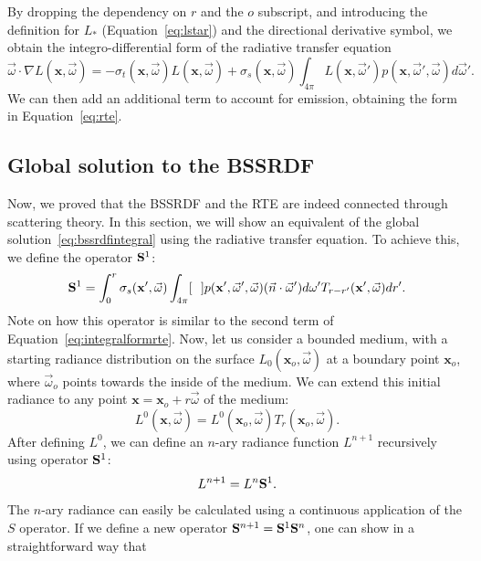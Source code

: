 By dropping the dependency on $r$ and the $o$ subscript, and introducing the definition for $L_*$ (Equation~\ref{eq:lstar}) and the directional derivative symbol, we obtain the integro-differential form of the radiative  transfer equation
\begin{equation*}\vec{\omega} \cdot \nabla L(\mathbf{x}, \vec{\omega}) = - \sigma_t(\mathbf{x}, \vec{\omega}) L(\mathbf{x}, \vec{\omega}) + \sigma_s(\mathbf{x}, \vec{\omega}) \int_{4\pi} L(\mathbf{x}, \vec{\omega}')  p(\mathbf{x}, \vec{\omega}', \vec{\omega}) d \vec{\omega}'.
\end{equation*}
We can then add an additional term to account for emission, obtaining the form in Equation~\ref{eq:rte}.
\subsection{Global solution to the BSSRDF}
Now, we proved that the BSSRDF and the RTE are indeed connected through scattering theory. In this section, we will show an equivalent of the global solution~\ref{eq:bssrdfintegral} using the radiative transfer equation. To achieve this, we define the operator $\mathbf{S}^1$:
\begin{equation*}
\mathbf{S}^1 = \int_0^r \sigma_s(\mathbf{x}', \vec{\omega}) \int_{4\pi} [\ \ ] p(\mathbf{x}', \vec{\omega}', \vec{\omega})  (\vec{n} \cdot \vec{\omega}')  d\omega' T_{r-r'}(\mathbf{x}', \vec{\omega})  dr'.
\end{equation*}
Note on how this operator is similar to the second term of Equation~\ref{eq:integralformrte}. Now, let us consider a bounded medium, with a starting radiance distribution on the surface $L_0(\mathbf{x}_o, \vec{\omega})$ at a boundary point $\mathbf{x}_o$, where $\vec{\omega}_o$ points towards the inside of the medium. We can extend this initial radiance to any point $\mathbf{x} = \mathbf{x}_o + r \vec{\omega}$ of the medium:
\begin{equation*}
L^0(\mathbf{x}, \vec{\omega}) = L^0(\mathbf{x}_o, \vec{\omega}) T_r(\mathbf{x}_o, \vec{\omega}).
\end{equation*}
After defining $L^0$, we can define an $n$-ary radiance function $L^{n+1}$ recursively using operator $\mathbf{S}^1$:
\begin{equation*}
L^{n+1} = L^n \mathbf{S}^1.
\end{equation*}
The $n$-ary radiance can easily be calculated using a continuous application of the $S$ operator. If we define a new operator $\mathbf{S}^{n+1} = \mathbf{S}^1 \mathbf{S}^n$, one can show in a straightforward way that 
